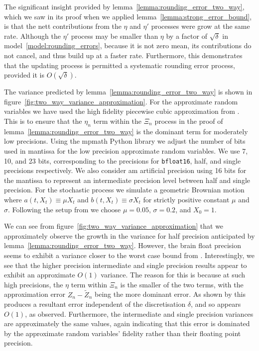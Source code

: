 \documentclass[9pt,a4paper,english]{extarticle}
\begin{document}
The significant insight provided by lemma~\ref{lemma:rounding_error_two_way}, which we saw in its proof when we applied lemma~\ref{lemma:strong_error_bound}, is that the nett contributions from the $ \eta $ and $ \eta' $ processes were grow at the same rate. Although the $ \eta' $ process may be smaller than $ \eta $ by a factor of $ \sqrt{\delta} $ in model~\ref{model:rounding_errors}, because it is not zero mean, its contributions do not cancel, and thus build up at a faster rate. Furthermore, this demonstrates that the updating process is permitted a systematic rounding error process, provided it is $ O(\sqrt{\delta}) $.

The variance predicted by lemma~\ref{lemma:rounding_error_two_way} is shown in figure~\ref{fig:two_way_variance_approximation}. For the approximate random variables we have used the high fidelity piecewise cubic approximation from \citet{giles2020approximating}. This is to ensure that the $ \eta_n $ term within the $ \Xi_n $ process in the proof of lemma~\ref{lemma:rounding_error_two_way} is the dominant term for moderately low precisions. Using the mpmath Python library \citep{mpmath} we adjust the number of bits used in mantissa for the low precision approximate random variables. We use 7, 10, and 23 bits, corresponding to the precisions for \texttt{bfloat16}, half, and single precisions respectively. We also consider am artificial precision using 16 bits for the mantissa to represent an intermediate precision level between half and single precision. For the stochastic process we simulate a geometric Brownian motion where $ a(t, X_t) \equiv \mu X_t $ and $ b(t, X_t) \equiv \sigma X_t $ for strictly positive constant $ \mu $ and $ \sigma $. Following the setup from \citet{giles2008multilevel} we choose $ \mu = 0.05 $, $ \sigma = 0.2 $, and $ X_0 = 1 $.

We can see from figure~\ref{fig:two_way_variance_approximation} that we approximately observe the growth in the variance for half precision anticipated by lemma~\ref{lemma:rounding_error_two_way}. However, the brain float precision seems to exhibit a variance closer to the worst case bound from \citet{omland2016mixed}. Interestingly, we see that the higher precision intermediate and single precision results appear to exhibit an approximate $ O(1) $ variance. The reason for this is because at such high precisions, the $ \eta $ term within $ \Xi_n $ is the smaller of the two terms, with the approximation error $ Z_n - \widetilde{Z}_n $ being the more dominant error. As shown by \citet{giles2020approximate} this produces a resultant error independent of the discretisation $ \delta $, and so appears $ O(1) $, as observed. Furthermore, the intermediate and single precision variances are approximately the same values, again indicating that this error is dominated by the approximate random variables' fidelity rather than their floating point precision. 
\end{document}
